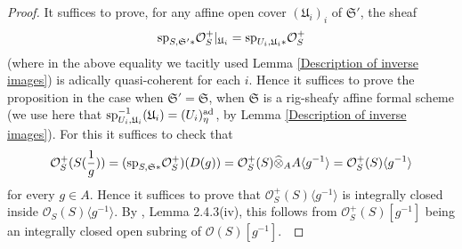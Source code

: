 \documentclass[12pt,twoside,a4paper]{article}
\theoremstyle{definition}
\theoremstyle{remark}
\newcommand\ad{{\rm ad}}
\newcommand\spc{{\rm sp}}
\begin{document}
\begin{proof}It suffices to prove, for any affine open cover $(\mathfrak{U}_{i})_{i}$ of $\mathfrak{S}'$, the sheaf\begin{equation*}\spc_{S,\mathfrak{S}'\ast}\mathcal{O}_{S}^{+}\vert_{\mathfrak{U}_{i}}=\spc_{U_{i},\mathfrak{U}_{i}\ast}\mathcal{O}_{S}^{+}\end{equation*}(where in the above equality we tacitly used Lemma \ref{Description of inverse images}) is adically quasi-coherent for each $i$. Hence it suffices to prove the proposition in the case when $\mathfrak{S}'=\mathfrak{S}$, when $\mathfrak{S}$ is a rig-sheafy affine formal scheme (we use here that $\spc_{U_{i},\mathfrak{U}_{i}}^{-1}(\mathfrak{U}_{i})=(U_{i})_{\eta}^{\ad}$, by Lemma \ref{Description of inverse images}). For this it suffices to check that \begin{equation*}\mathcal{O}_{S}^{+}(S(\frac{1}{g}))=(\spc_{S,\mathfrak{S}\ast}\mathcal{O}_{S}^{+})(D(g))=\mathcal{O}_{S}^{+}(S)\widehat{\otimes}_{A}A\langle g^{-1}\rangle=\mathcal{O}_{S}^{+}(S)\langle g^{-1}\rangle\end{equation*}for every $g\in A$. Hence it suffices to prove that $\mathcal{O}_{S}^{+}(S)\langle g^{-1}\rangle$ is integrally closed inside $\mathcal{O}_{S}(S)\langle g^{-1}\rangle$. By \cite{Huber0}, Lemma 2.4.3(iv), this follows from $\mathcal{O}_{S}^{+}(S)[g^{-1}]$ being an integrally closed open subring of $\mathcal{O}(S)[g^{-1}]$. \end{proof}
 
\end{document}
